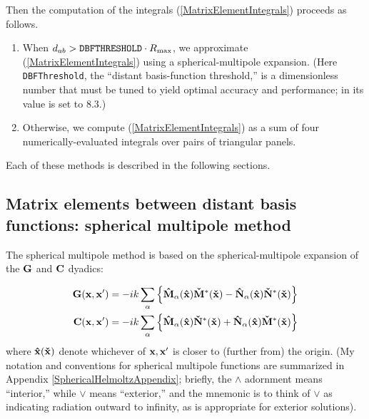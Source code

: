\documentclass[dvips,letterpaper]{article}
\begin{document}
Then the computation of the integrals (\ref{MatrixElementIntegrals})
proceeds as follows. 

\begin{enumerate}
 \item
 When $d_{ab} > \texttt{DBFTHRESHOLD}\cdot R_{\hbox{\scriptsize{max}}}$,
 we approximate (\ref{MatrixElementIntegrals}) using a 
 spherical-multipole expansion. 
 (Here \texttt{DBFThreshold}, the ``distant basis-function threshold,''
 is a dimensionless number that must be tuned to yield 
 optimal accuracy and performance; in \lss its value is set to 8.3.)
 \item
 Otherwise, we compute (\ref{MatrixElementIntegrals}) as a sum
 of four numerically-evaluated integrals over pairs of triangular
 panels.
\end{enumerate}

Each of these methods is described in the following sections.

\subsection{Matrix elements between distant basis functions: 
            spherical multipole method}
\label{SphericalMultipoleMatrixElementSection}

The spherical multipole method is based on the spherical-multipole
expansion of the $\mathbf{G}$ and $\mathbf{C}$ dyadics:

\begin{align*}
 \mathbf{G}(\mathbf{x}, \mathbf{x}^\prime)
 &= -ik\sum_{\alpha} 
      \left\{   \mathbf{\hat M}_{\alpha}(\mathbf{\hat x})\mathbf{\check M}^*(\mathbf{\check x})
              - \mathbf{\hat N}_{\alpha}(\mathbf{\hat x})\mathbf{\check N}^*(\mathbf{\check x})
      \right\} 
\\
 \mathbf{C}(\mathbf{x}, \mathbf{x}^\prime)
 &= -ik\sum_{\alpha} 
      \left\{   \mathbf{\hat M}_{\alpha}(\mathbf{\hat x})\mathbf{\check N}^*(\mathbf{\check x}) 
              + \mathbf{\hat N}_{\alpha}(\mathbf{\hat x})\mathbf{\check M}^*(\mathbf{\check x})
      \right\} 
\end{align*}
where $\mathbf{\hat x} (\mathbf{\check x})$ denote whichever of $\mathbf{x}, \mathbf{x}^\prime$
is closer to (further from) the origin.
(My notation and conventions for spherical multipole functions
are summarized in Appendix \ref{SphericalHelmoltzAppendix}; 
briefly, the $\wedge$ adornment means ``interior,'' 
while $\vee$ means ``exterior,'' and the mnemonic is to 
think of $\vee$ as indicating radiation outward to infinity,
as is appropriate for exterior solutions).
\end{document}
